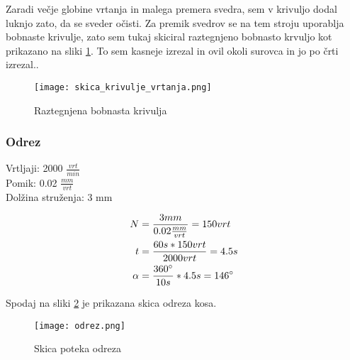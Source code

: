         Zaradi večje globine vrtanja in malega premera svedra, 
        sem v krivuljo dodal luknjo zato, da se sveder očisti.
        Za premik svedrov se na tem stroju uporablja bobnaste krivulje,
        zato sem tukaj skiciral raztegnjeno bobnasto krvuljo kot prikazano
        na sliki \ref{raztegnjen_boben}. To sem kasneje
        izrezal in ovil okoli surovca in jo po črti izrezal..
        
        \begin{figure}[H]
            \begin{center}
                \texttt{[image: skica\_krivulje\_vrtanja.png]}
                \caption{Raztegnjena bobnasta krivulja
                \cite{lasten}}
                \label{raztegnjen_boben}
            \end{center}
        \end{figure}
        \newpage

    \subsubsection{Odrez}
        Vrtljaji: 2000 \( \frac{vrt}{min} \) \\
        Pomik: 0.02 \( \frac{mm}{vrt} \) \\
        Dolžina struženja: 3 mm

        \begin{equation}
            \begin{split}
                N &= \frac{3mm}{0.02\frac{mm}{vrt}} = 150 vrt \\
                t &= \frac{60s * 150 vrt}{2000 vrt} = 4.5 s \\
                \alpha &= \frac{360 \degree}{10 s} * 4.5 s = 146 \degree \\
            \end{split}
        \end{equation}

        Spodaj na sliki \ref{odrez} je prikazana skica odreza kosa.
        \begin{figure}[H]
            \begin{center}
                \texttt{[image: odrez.png]}
                \caption{Skica poteka odreza
                \cite{lasten}}
                \label{odrez}
            \end{center}
        \end{figure}

        \newpage

